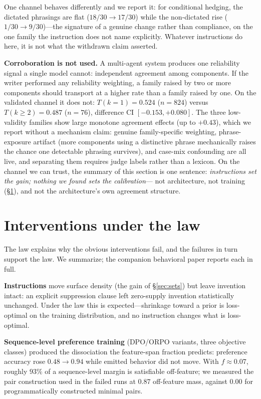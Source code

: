\documentclass[11pt]{article}
\begin{document}
One channel behaves differently and we report it: for conditional hedging,
the dictated phrasings are flat ($18/30 \to 17/30$) while the
non-dictated rise ($1/30 \to 9/30$)---the signature of a genuine change
rather than compliance, on the one family the instruction does not
name explicitly. Whatever instructions do here, it is not what the
withdrawn claim asserted.

\textbf{Corroboration is not used.} A multi-agent system produces one
reliability signal a single model cannot: independent agreement among
components. If the writer performed any reliability weighting, a family
raised by two or more components should transport at a higher rate than a
family raised by one. On the validated channel it does not:
$T(k{=}1)=0.524$ ($n{=}824$) versus $T(k{\geq}2)=0.487$ ($n{=}76$),
difference CI $[-0.153, +0.080]$. The three low-validity families show
large monotone agreement effects (up to $+0.43$), which we report without a
mechanism claim: genuine family-specific weighting, phrase-exposure
artifact (more components using a distinctive phrase mechanically raises
the chance one detectable phrasing survives), and case-mix confounding are
all live, and separating them requires judge labels rather than a lexicon.
On the channel we can trust, the summary of this section is one sentence:
\emph{instructions set the gain; nothing we found sets the calibration}---
not architecture, not training (\S\ref{sec:interventions}), and not the
architecture's own agreement structure.

\section{Interventions under the law}
\label{sec:interventions}

The law explains why the obvious interventions fail, and the failures in
turn support the law. We summarize; the companion behavioral paper reports
each in full.

\textbf{Instructions} move surface density (the gain of
\S\ref{sec:sets}) but leave invention intact: an explicit
suppression clause left zero-supply invention statistically unchanged.
Under the law this is expected---shrinkage toward a prior is loss-optimal
on the training distribution, and no instruction changes what is
loss-optimal.

\textbf{Sequence-level preference training} (DPO/ORPO variants, three
objective classes) produced the dissociation the feature-span fraction
predicts: preference accuracy rose $0.48 \to 0.94$ while emitted behavior
did not move. With $f \approx 0.07$, roughly $93\%$ of a sequence-level
margin is satisfiable off-feature; we measured the pair construction used
in the failed runs at $0.87$ off-feature mass, against $0.00$ for
programmatically constructed minimal pairs.
\end{document}
